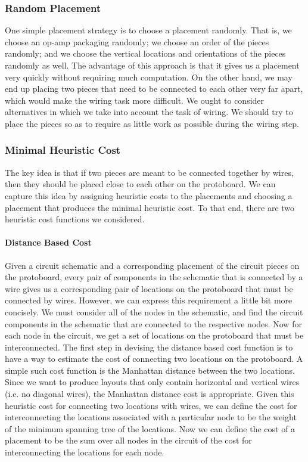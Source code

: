 \subsubsection{Random Placement}

One simple placement strategy is to choose a placement randomly.
That is, we choose
an op-amp packaging randomly; we choose an order of the pieces randomly; and we
choose the vertical locations and orientations of the pieces randomly as well.
The advantage of this
approach is that it gives us a placement very quickly without requiring much
computation. On the other hand, we may end up placing two pieces that need to be
connected to each other very far apart, which would make the wiring task more
difficult. We ought to consider alternatives in which we take into
account the task of wiring. We should try to place the pieces so as to require
as little work as possible during the wiring step.

\subsubsection{Minimal Heuristic Cost}

The key idea is that if two pieces are meant to be connected together by wires,
then they should be placed close to each other on the protoboard. We can
capture this idea by assigning heuristic costs to the placements and choosing
a placement that produces the minimal heuristic cost. To that end, there are two
heuristic cost functions we considered.

\paragraph{Distance Based Cost}
Given a circuit
schematic and a corresponding placement of the circuit pieces on the protoboard,
every pair of components in the schematic that is connected by a wire gives us
a corresponding pair of
locations on the protoboard that must be connected by wires. However, we can
express this requirement a little bit more concisely. We must consider all
of the nodes in the schematic, and find the circuit components in the schematic
that are connected to the respective nodes. Now for each node in the circuit, we
get a set of locations on the protoboard that must be interconnected. The
first step in devising the distance based cost function is to have a way to
estimate the cost of connecting two locations on the protoboard. A simple such
cost function is the Manhattan distance between the two
locations. Since we want to produce layouts that only contain
horizontal and vertical wires (i.e. no diagonal wires), the Manhattan distance
cost is appropriate. Given this heuristic cost for connecting two locations with
wires, we can define the cost for interconnecting the locations
associated with a particular node to be the weight of the minimum spanning tree
of the locations. Now we can define the cost of a placement to be the sum over
all nodes in the circuit of the cost for interconnecting the locations for each
node.

